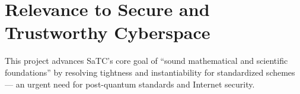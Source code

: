 \section{Relevance to Secure and Trustworthy Cyberspace}

This project advances SaTC’s core goal of ``sound mathematical and scientific foundations'' by resolving tightness and instantiability for standardized schemes --- an urgent need for post-quantum standards and Internet security.





